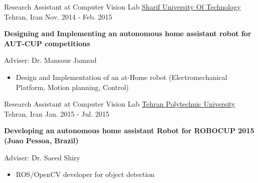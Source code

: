 \begin{cventries}
  \cventry
    {Research Assistant at Computer Vision Lab} %
    {\href{http://www.sharif.ir/web/en}{Sharif University Of Technology}} %
    {Tehran, Iran} %
    {Nov. 2014 - Feb. 2015} %
    {
      \begin{cvitems} %
			\item \textbf{Designing and Implementing an autonomous home assistant robot for AUT-CUP competitions} \begin{flushright} {\color{awesome} Adviser: Dr. Mansour Jamzad} \end{flushright}
			\begin{itemize}
					\item Design and Implementation of an at-Home robot (Electromechanical Platform, Motion planning, Control)
			\end{itemize}
      \end{cvitems}
    }

  \cventry
    {Research Assistant at Computer Vision Lab} %
    {\href{http://aut.ac.ir/aut/}{Tehran Polytechnic University}} %
    {Tehran, Iran} %
    {Jan. 2015 - Jul. 2015} %
    {
      \begin{cvitems} %
        \item \textbf{Developing an autonomous home assistant  Robot for ROBOCUP 2015 (Joao Pessoa, Brazil)} \begin{flushright} {\color{awesome} Adviser: Dr. Saeed Shiry} \end{flushright}
        \begin{itemize}
        \item ROS/OpenCV developer for object detection
        \end{itemize}
      \end{cvitems}
    }



\end{cventries}

